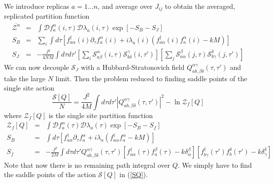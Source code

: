 \documentclass[aps,prx,preprint,onecolumn,citeautoscript,superscriptaddress,nofootinbib,
eqsecnum]{revtex4}
\newcommand{\beq}{\begin{equation}}
\newcommand{\eeq}{\end{equation}}
\def\bea{\begin{eqnarray}}
\def\eea{\end{eqnarray}}
\begin{document}
We introduce replicas $a=1 \ldots n$, and average over $J_{ij}$ to obtain the averaged, replicated partition function
\bea
\overline{\mathcal{Z}^n} &=& \int \mathcal{D} f_a^\alpha (i, \tau)  \mathcal{D} \lambda_{a} (i, \tau) \exp \left[ - {S}_B - {S}_J \right] \nonumber \\
{S}_B &=& \sum_i \int d \tau \left[ f_{a\alpha}^\dagger (i) \partial_\tau f_{a}^\alpha (i) + i \lambda_a (i) \left( f_{a\alpha}^\dagger (i) f_a^\alpha (i) - k M \right) \right] \nonumber \\
{S}_J &=& - \frac{J^2}{4NM} \int d \tau d \tau' \left[ \sum_i \mathcal{S}_{a \beta}^\alpha (i, \tau) \mathcal{S}_{b \delta}^\gamma (i,\tau') \right]
\left[ \sum_j \mathcal{S}_{a \alpha}^\beta (j, \tau) \mathcal{S}_{b \gamma}^\delta (j,\tau') \right]
\eea
We can now decouple $\mathcal{S}_J$ with a Hubbard-Stratonovich field $Q_{ab,\beta\delta}^{\alpha\gamma} (\tau, \tau')$ and take the large $N$ limit.
Then the problem reduced to finding saddle points of the single site action
\beq
\frac{\mathcal{S}[Q]}{N} =  \frac{J^2}{4 M} \int d \tau d \tau' |Q_{ab,\beta\delta}^{\alpha\gamma} (\tau, \tau')|^2 - \ln \mathcal{Z}_f [Q] \label{SQ}
\eeq
where $\mathcal{Z}_f [Q]$ is the single site partition function
\bea
\mathcal{Z}_f [Q] &=& \int \mathcal{D} f_a^\alpha (\tau)  \mathcal{D} \lambda_{a} (\tau) \exp \left[ - {S}_B - {S}_f \right] \label{ZQ1} \\
{S}_B &=& \int d \tau \left[ f_{a\alpha}^\dagger \partial_\tau f_{a}^\alpha  + i \lambda_a  \left( f_{a\alpha}^\dagger  f_a^\alpha - k M \right) \right] 
\label{ZQ2} \\
{S}_f &=& - \frac{J^2}{2M} \int d \tau d \tau' Q_{ab,\beta\delta}^{\alpha\gamma} (\tau, \tau') \left[ f_{a \alpha}^\dagger (\tau) f_a^\beta (\tau) - k \delta_{\alpha}^\beta \right] \left[ f_{b \gamma}^\dagger (\tau') f_b^\delta (\tau') - k \delta_{\gamma}^{\delta} \right] \label{ZQ3}
\eea
Note that now there is no remaining path integral over $Q$. We simply have to find the saddle points of the action $\mathcal{S}[Q]$ in (\ref{SQ}). 
\end{document}
